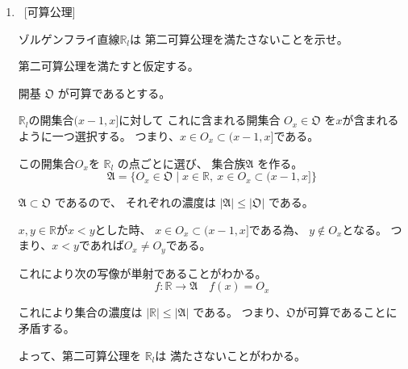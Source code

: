 \documentclass[12pt,b5paper]{ltjsarticle}
\begin{document}
\begin{enumerate}
      \hrulefill

 \item
      \
      [可算公理]

      ゾルゲンフライ直線$\mathbb{R}_{l}$は
      第二可算公理を満たさないことを示せ。

      \dotfill

      第二可算公理を満たすと仮定する。

      開基
      $\mathfrak{O}$
      が可算であるとする。

      $\mathbb{R}_{l}$の開集合$(x-1,x]$に対して
      これに含まれる開集合
      $O_{x}\in\mathfrak{O}$
      を$x$が含まれるように一つ選択する。
      つまり、$x\in O_{x} \subset (x-1,x]$である。

      この開集合$O_{x}$を
      $\mathbb{R}_{l}$
      の点ごとに選び、
      集合族$\mathfrak{A}$
      を作る。
      \begin{equation}
       \mathfrak{A}=
        \{ O_{x}\in\mathfrak{O} \mid
        x\in\mathbb{R},\ x\in O_{x} \subset (x-1,x] \}
      \end{equation}

      $\mathfrak{A} \subset \mathfrak{O}$
      であるので、
      それぞれの濃度は
      $\lvert \mathfrak{A} \rvert \leq \lvert \mathfrak{O} \rvert$
      である。

      $x,y\in\mathbb{R}$が$x<y$とした時、
      $x\in O_{x} \subset (x-1,x]$である為、
      $y\not\in O_{x}$となる。
      つまり、$x<y$であれば$O_{x}\ne O_{y}$である。

      これにより次の写像が単射であることがわかる。
      \begin{equation}
       f:\mathbb{R} \to \mathfrak{A}
        \quad
        f(x) = O_{x}
      \end{equation}

      これにより集合の濃度は
      $\lvert \mathbb{R} \rvert \leq \lvert \mathfrak{A} \rvert$
      である。
      つまり、$\mathfrak{O}$が可算であることに矛盾する。

      よって、第二可算公理を
      $\mathbb{R}_{l}$は
      満たさないことがわかる。

      \hrulefill

\end{enumerate}
\end{document}
